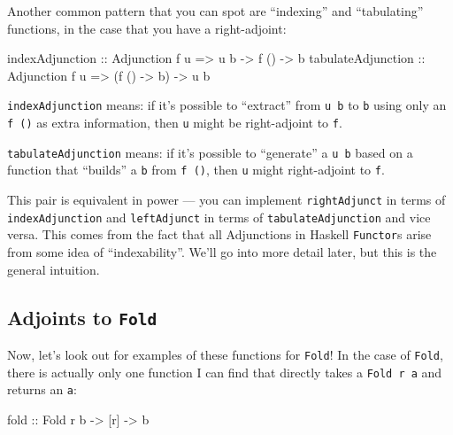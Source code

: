 \documentclass[]{article}
\newenvironment{Shaded}{}{}
\newcommand{\DataTypeTok}[1]{\textcolor[rgb]{0.56,0.13,0.00}{#1}}
\newcommand{\NormalTok}[1]{#1}
\newcommand{\OtherTok}[1]{\textcolor[rgb]{0.00,0.44,0.13}{#1}}
\begin{document}
Another common pattern that you can spot are ``indexing'' and ``tabulating''
functions, in the case that you have a right-adjoint:

\begin{Shaded}
\begin{Highlighting}[]
\OtherTok{indexAdjunction    ::} \DataTypeTok{Adjunction}\NormalTok{ f u }\OtherTok{=\textgreater{}}\NormalTok{ u b }\OtherTok{{-}\textgreater{}}\NormalTok{ f () }\OtherTok{{-}\textgreater{}}\NormalTok{ b}
\OtherTok{tabulateAdjunction ::} \DataTypeTok{Adjunction}\NormalTok{ f u }\OtherTok{=\textgreater{}}\NormalTok{ (f () }\OtherTok{{-}\textgreater{}}\NormalTok{ b) }\OtherTok{{-}\textgreater{}}\NormalTok{ u b}
\end{Highlighting}
\end{Shaded}

\texttt{indexAdjunction} means: if it's possible to ``extract'' from
\texttt{u\ b} to \texttt{b} using only an \texttt{f\ ()} as extra information,
then \texttt{u} might be right-adjoint to \texttt{f}.

\texttt{tabulateAdjunction} means: if it's possible to ``generate'' a
\texttt{u\ b} based on a function that ``builds'' a \texttt{b} from
\texttt{f\ ()}, then \texttt{u} might right-adjoint to \texttt{f}.

This pair is equivalent in power --- you can implement \texttt{rightAdjunct} in
terms of \texttt{indexAdjunction} and \texttt{leftAdjunct} in terms of
\texttt{tabulateAdjunction} and vice versa. This comes from the fact that all
Adjunctions in Haskell \texttt{Functor}s arise from some idea of
``indexability''. We'll go into more detail later, but this is the general
intuition.

\subsection{\texorpdfstring{Adjoints to
\texttt{Fold}}{Adjoints to Fold}}\label{adjoints-to-fold}

Now, let's look out for examples of these functions for \texttt{Fold}! In the
case of \texttt{Fold}, there is actually only one function I can find that
directly takes a \texttt{Fold\ r\ a} and returns an \texttt{a}:

\begin{Shaded}
\begin{Highlighting}[]
\OtherTok{fold ::} \DataTypeTok{Fold}\NormalTok{ r b }\OtherTok{{-}\textgreater{}}\NormalTok{ [r] }\OtherTok{{-}\textgreater{}}\NormalTok{ b}
\end{Highlighting}
\end{Shaded}
\end{document}
